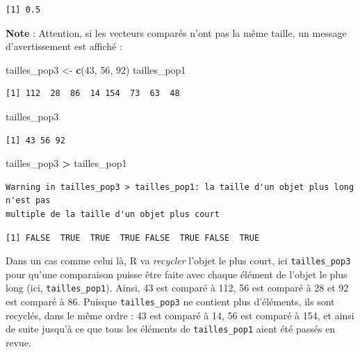 \documentclass[a4paperpaper,]{article}
\newenvironment{Shaded}{\begin{snugshade}}{\end{snugshade}}
\newcommand{\KeywordTok}[1]{\textcolor[rgb]{0.13,0.29,0.53}{\textbf{#1}}}
\newcommand{\DecValTok}[1]{\textcolor[rgb]{0.00,0.00,0.81}{#1}}
\newcommand{\StringTok}[1]{\textcolor[rgb]{0.31,0.60,0.02}{#1}}
\newcommand{\OperatorTok}[1]{\textcolor[rgb]{0.81,0.36,0.00}{\textbf{#1}}}
\newcommand{\NormalTok}[1]{#1}
\theoremstyle{definition}
\theoremstyle{definition}
\theoremstyle{definition}
\theoremstyle{remark}
\begin{document}
\begin{verbatim}
[1] 0.5
\end{verbatim}

\textbf{Note} : Attention, si les vecteurs comparés n'ont pas la même
taille, un message d'avertissement est affiché :

\begin{Shaded}
\begin{Highlighting}[]
\NormalTok{tailles_pop3 <-}\StringTok{ }\KeywordTok{c}\NormalTok{(}\DecValTok{43}\NormalTok{, }\DecValTok{56}\NormalTok{, }\DecValTok{92}\NormalTok{)}
\NormalTok{tailles_pop1}
\end{Highlighting}
\end{Shaded}

\begin{verbatim}
[1] 112  28  86  14 154  73  63  48
\end{verbatim}

\begin{Shaded}
\begin{Highlighting}[]
\NormalTok{tailles_pop3}
\end{Highlighting}
\end{Shaded}

\begin{verbatim}
[1] 43 56 92
\end{verbatim}

\begin{Shaded}
\begin{Highlighting}[]
\NormalTok{tailles_pop3 }\OperatorTok{>}\StringTok{ }\NormalTok{tailles_pop1}
\end{Highlighting}
\end{Shaded}

\begin{verbatim}
Warning in tailles_pop3 > tailles_pop1: la taille d'un objet plus long n'est pas
multiple de la taille d'un objet plus court
\end{verbatim}

\begin{verbatim}
[1] FALSE  TRUE  TRUE  TRUE FALSE  TRUE FALSE  TRUE
\end{verbatim}

Dans un cas comme celui là, R va \emph{recycler} l'objet le plus court,
ici \texttt{tailles\_pop3} pour qu'une comparaison puisse être faite
avec chaque élément de l'objet le plus long (ici,
\texttt{tailles\_pop1}). Ainsi, 43 est comparé à 112, 56 est comparé à
28 et 92 est comparé à 86. Puisque \texttt{tailles\_pop3} ne contient
plus d'éléments, ils sont recyclés, dans le même ordre : 43 est comparé
à 14, 56 est comparé à 154, et ainsi de suite jusqu'à ce que tous les
éléments de \texttt{tailles\_pop1} aient été passés en revue.
\end{document}
